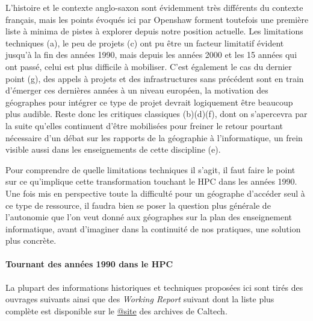L'histoire et le contexte anglo-saxon sont évidemment très différents du contexte français, mais les points évoqués ici par Openshaw forment toutefois une première liste à minima de pistes à explorer depuis notre position actuelle. Les limitations techniques (a), le peu de projets (c) ont pu être un facteur limitatif évident jusqu'à la fin des années 1990, mais depuis les années 2000 et les 15 années qui ont passé, celui est plus difficile à mobiliser. C'est également le cas du dernier point (g), des appels à projets et des infrastructures sans précédent sont en train d'émerger ces dernières années à un niveau européen, la motivation des géographes pour intégrer ce type de projet devrait logiquement être beaucoup plus audible. Reste donc les critiques classiques (b)(d)(f), dont on s'apercevra par la suite qu'elles continuent d'être mobilisées pour freiner le retour pourtant nécessaire d'un débat sur les rapports de la géographie à l'informatique, un frein visible aussi dans les enseignements de cette discipline (e).

Pour comprendre de quelle limitations techniques il s'agit, il faut faire le point sur ce qu'implique cette transformation touchant le HPC dans les années 1990. Une fois mis en perspective toute la difficulté pour un géographe d'accéder seul à ce type de ressource, il faudra bien se poser la question plus générale de l'autonomie que l'on veut donné aux géographes sur la plan des enseignement informatique, avant d'imaginer dans la continuité de nos pratiques, une solution plus concrète.

\paragraph{Tournant des années 1990 dans le HPC}
\label{p:Tournant1980}

La plupart des informations historiques et techniques proposées ici sont tirés des ouvrages suivants \autocites{Fox1994, Fox1988, Seitz1985, CM2-1990, Lerman1993, Padua2011, Dietrich1984}[81-84]{Culler1998, Steele2011} ainsi que des \textit{Working Report} suivant \autocites{Athas1987, Su1987, Seitz1983, Seitz1984a, Seitz1984b} dont la liste plus complète est disponible sur le \href{http://authors.library.caltech.edu/view/person-az/Seitz-C-L.html}{@site} des archives de Caltech.

